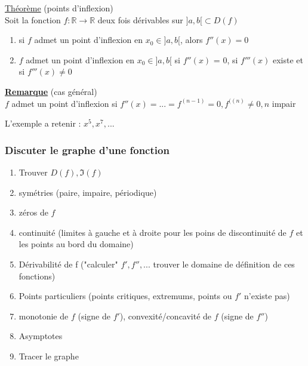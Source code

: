 \documentclass[12pt,a4paper]{article}
\newcommand{\evid}[1]{\textbf{\underline{#1}}}
\newcommand{\R}{\ensuremath{\mathbb{R}} }
\newcommand{\rtor}{\ensuremath{\R \to \R} }
\newcommand{\Theoreme}{\underline{Théorème} }
\begin{document}
{\begin{boite}
	\Theoreme (points d'inflexion)\\
	Soit la fonction $f:\rtor$ deux fois dérivables sur $]a,b[ \subset D(f)$
	\begin{enumerate}[label=\roman*)]
		\item si $f$ admet un point d'inflexion en $x_0 \in ]a,b[$, alors $f''(x) = 0$
		\item $f$ admet un point d'inflexion en $x_0 \in ]a,b[$ si $f''(x)$ = 0, si $f'''(x)$ existe et si $f'''(x) \neq 0$
	\end{enumerate}
\end{boite}
\begin{boite}
	\evid{Remarque} (cas général)\\
	$f$ admet un point d'inflexion si $f''(x) = ... = f^{(n-1)} = 0, f^{((n)}\neq 0, n$ impair
\end{boite}
L'exemple a retenir : $x^5, x^7,..$.

\subsubsection{Discuter le graphe d'une fonction}
\begin{enumerate}
	\item Trouver $D(f), \Im (f)$
	\item symétries (paire, impaire, périodique)
	\item zéros de $f$
	\item continuité (limites à gauche et à droite pour les poins de discontinuité de $f$ et les points au bord du domaine)
	\item Dérivabilité de f ("calculer" $f', f'',...$ trouver le domaine  de définition de ces fonctions)
	\item Points particuliers (points critiques, extremums, points ou $f'$ n'existe pas)
	\item monotonie de $f$ (signe de $f'$), convexité/concavité de $f$ (signe de $f''$)
	\item Asymptotes
	\item Tracer le graphe
\end{enumerate}

}
\end{document}

